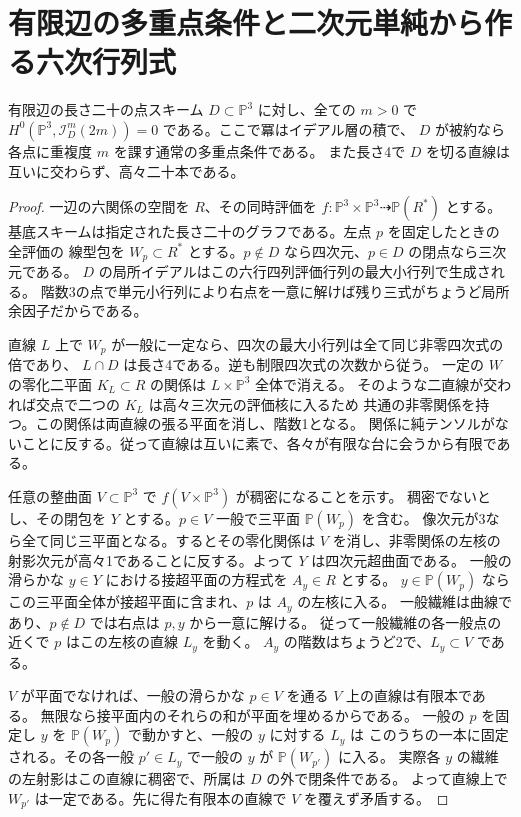 \section{有限辺の多重点条件と二次元単純から作る六次行列式}
\label{sec:finite-edge-symbolic-powers}
\begin{theorem}\label{thm:finite-edge-symbolic-powers}
有限辺の長さ二十の点スキーム $D\subset\mathbb P^3$ に対し、全ての $m>0$ で
$H^0(\mathbb P^3,\mathcal I_D^m(2m))=0$ である。ここで冪はイデアル層の積で、
$D$ が被約なら各点に重複度 $m$ を課す通常の多重点条件である。
また長さ4で $D$ を切る直線は互いに交わらず、高々二十本である。
\end{theorem}
\begin{proof}
一辺の六関係の空間を $R$、その同時評価を
$f:\mathbb P^3\times\mathbb P^3\dashrightarrow\mathbb P(R^*)$ とする。
基底スキームは指定された長さ二十のグラフである。左点 $p$ を固定したときの全評価の
線型包を $W_p\subset R^*$ とする。$p\notin D$ なら四次元、$p\in D$ の閉点なら三次元である。
$D$ の局所イデアルはこの六行四列評価行列の最大小行列で生成される。
階数3の点で単元小行列により右点を一意に解けば残り三式がちょうど局所余因子だからである。

直線 $L$ 上で $W_p$ が一般に一定なら、四次の最大小行列は全て同じ非零四次式の倍であり、
$L\cap D$ は長さ4である。逆も制限四次式の次数から従う。
一定の $W$ の零化二平面 $K_L\subset R$ の関係は $L\times\mathbb P^3$ 全体で消える。
そのような二直線が交われば交点で二つの $K_L$ は高々三次元の評価核に入るため
共通の非零関係を持つ。この関係は両直線の張る平面を消し、階数1となる。
関係に純テンソルがないことに反する。従って直線は互いに素で、各々が有限な台に会うから有限である。

任意の整曲面 $V\subset\mathbb P^3$ で $f(V\times\mathbb P^3)$ が稠密になることを示す。
稠密でないとし、その閉包を $Y$ とする。$p\in V$ 一般で三平面 $\mathbb P(W_p)$ を含む。
像次元が3なら全て同じ三平面となる。するとその零化関係は $V$ を消し、非零関係の左核の
射影次元が高々1であることに反する。よって $Y$ は四次元超曲面である。
一般の滑らかな $y\in Y$ における接超平面の方程式を $A_y\in R$ とする。
$y\in\mathbb P(W_p)$ ならこの三平面全体が接超平面に含まれ、$p$ は $A_y$ の左核に入る。
一般繊維は曲線であり、$p\notin D$ では右点は $p,y$ から一意に解ける。
従って一般繊維の各一般点の近くで $p$ はこの左核の直線 $L_y$ を動く。
$A_y$ の階数はちょうど2で、$L_y\subset V$ である。

$V$ が平面でなければ、一般の滑らかな $p\in V$ を通る $V$ 上の直線は有限本である。
無限なら接平面内のそれらの和が平面を埋めるからである。
一般の $p$ を固定し $y$ を $\mathbb P(W_p)$ で動かすと、一般の $y$ に対する $L_y$ は
このうちの一本に固定される。その各一般 $p'\in L_y$ で一般の $y$ が $\mathbb P(W_{p'})$ に入る。
実際各 $y$ の繊維の左射影はこの直線に稠密で、所属は $D$ の外で閉条件である。
よって直線上で $W_{p'}$ は一定である。先に得た有限本の直線で $V$ を覆えず矛盾する。


\end{proof}

